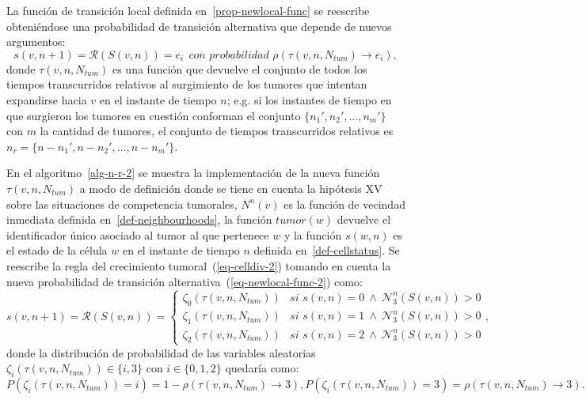 \begin{definition}
\label{prop-newlocal-func-2}
La funci\'on de transici\'on local definida en~\ref{prop-newlocal-func} se reescribe obteni\'endose una probabilidad de transici\'on alternativa que depende de nuevos argumentos:
\begin{equation}
s(v,n+1) = \mathcal{R}(S(v,n)) = e_i~~\textit{con probabilidad } \rho(\tau(v,n,N_{tum}) \rightarrow e_i), \label{eq-newlocal-func-2}
\end{equation}
donde $\tau(v,n,N_{tum})$ es una funci\'on que devuelve el conjunto de todos los tiempos transcurridos relativos al surgimiento de los tumores que intentan expandirse hacia $v$ en el instante de tiempo $n$; e.g. si los instantes de tiempo en que surgieron los tumores en cuesti\'on conforman el conjunto $\lbrace n_1', n_2', \ldots, n_m' \rbrace$ con $m$ la cantidad de tumores, el conjunto de tiempos transcurridos relativos es $n_r = \lbrace n-n_1',n-n_2', \ldots, n-n_m' \rbrace$.
\end{definition}

En el algoritmo~\ref{alg-n-r-2} se muestra la implementaci\'on de la nueva funci\'on $\tau(v,n,N_{tum})$ a modo de definici\'on donde se tiene en cuenta la hip\'otesis XV sobre las situaciones de competencia tumorales, $N^n(v)$ es la funci\'on de vecindad inmediata definida en~\ref{def-neighbourhoods}, la funci\'on $tumor(w)$ devuelve el identificador \'unico asociado al tumor al que pertenece $w$ y la funci\'on $s(w,n)$ es el estado de la c\'elula $w$ en el instante de tiempo $n$ definida en~\ref{def-cellstatus}. Se reescribe la regla del crecimiento tumoral~(\ref{eq-celldiv-2}) tomando en cuenta la nueva probabilidad de transici\'on alternativa~(\ref{eq-newlocal-func-2}) como:
\begin{equation}
s(v,n+1)=\mathcal{R}(S(v,n))=\left\lbrace
	\begin{array}{ll}
		\zeta_0(\tau(v,n,N_{tum}))& \textit{si } s(v,n)=0~\wedge~\mathcal{N}_3^n(S(v,n)) > 0 \\
		\zeta_1(\tau(v,n,N_{tum}))& \textit{si } s(v,n)=1~\wedge~\mathcal{N}_3^n(S(v,n)) > 0 \\
		\zeta_2(\tau(v,n,N_{tum}))& \textit{si } s(v,n)=2~\wedge~\mathcal{N}_3^n(S(v,n)) > 0 
	\end{array}
\right., \label{eq-celldiv-3}
\end{equation}
donde la distribuci\'on de probabilidad de las variables aleatorias $\zeta_i(\tau(v,n,N_{tum})) \in \lbrace i,3 \rbrace$ con $i \in \lbrace 0,1,2 \rbrace$ quedar\'ia como:
\begin{subequations}
\begin{equation}
P(\zeta_i(\tau(v,n,N_{tum}))=i) = 1 - \rho(\tau(v,n,N_{tum}) \rightarrow 3),
\end{equation}
\begin{equation}
P(\zeta_i(\tau(v,n,N_{tum}))=3) = \rho(\tau(v,n,N_{tum}) \rightarrow 3).
\end{equation}
\end{subequations}


